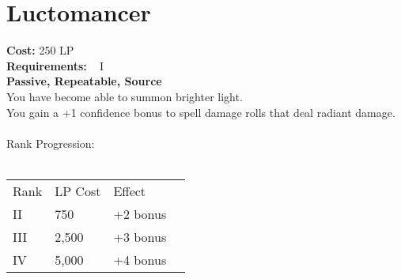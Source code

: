 \section{Luctomancer}\label{perk:luctomancer}
\textbf{Cost:} 250 LP\\
\textbf{Requirements:} ~ I\\
\textbf{Passive, Repeatable, Source}\\
You have become able to summon brighter light.\\
You gain a +1 confidence bonus to spell damage rolls that deal radiant damage.\\
\\
Rank Progression:\\
\\
\begin{tabular}{l | l | l | l}
    Rank & LP Cost &  Effect\\
    II & 750 & +2 bonus\\
    III & 2,500 & +3 bonus\\
    IV & 5,000 & +4 bonus\\
\end{tabular}